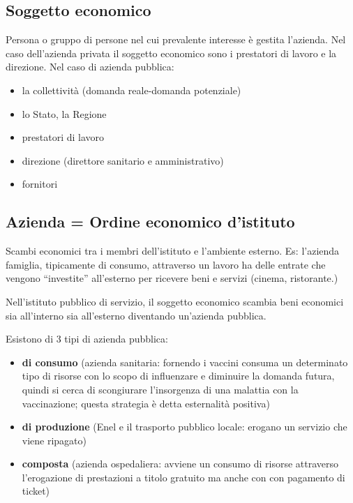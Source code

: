 \subsection{Soggetto economico}

Persona o gruppo di persone nel cui prevalente interesse è gestita l'azienda. Nel caso dell'azienda privata il soggetto economico sono i prestatori di lavoro e la direzione. Nel caso di azienda pubblica:

\begin{itemize}
\item
  la collettività (domanda reale-domanda potenziale)
\item
  lo Stato, la Regione
\item
  prestatori di lavoro
\item
  direzione (direttore sanitario e amministrativo)
\item
  fornitori
\end{itemize}

\subsection{Azienda = Ordine economico d'istituto}

Scambi economici tra i membri dell'istituto e l'ambiente esterno. Es: l'azienda famiglia, tipicamente di consumo, attraverso un lavoro ha delle entrate che vengono ``investite'' all'esterno per ricevere beni e servizi (cinema, ristorante.)

Nell'istituto pubblico di servizio, il soggetto economico scambia beni economici sia all'interno sia all'esterno diventando un'azienda pubblica.

Esistono di 3 tipi di azienda pubblica:

\begin{itemize}
\item
  \textbf{di consumo} (azienda sanitaria: fornendo i vaccini consuma un
  determinato tipo di risorse con lo scopo di influenzare e diminuire la
  domanda futura, quindi si cerca di scongiurare l'insorgenza di una
  malattia con la vaccinazione; questa strategia è detta esternalità
  positiva)
\item
  \textbf{di produzione} (Enel e il trasporto pubblico locale: erogano
  un servizio che viene ripagato)
\item
  \textbf{composta} (azienda ospedaliera: avviene un consumo di risorse
  attraverso l'erogazione di prestazioni a titolo gratuito ma anche con
  con pagamento di ticket)
\end{itemize}

